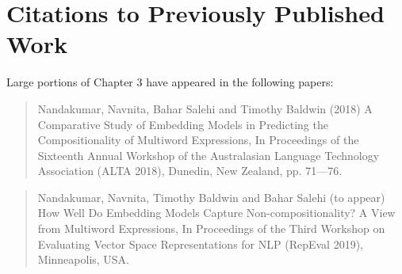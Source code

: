 \documentclass[12pt,a4paper, margin=1in]{report}
\begin{document}
\chapter*{\centering \LARGE Citations to Previously Published Work}
Large portions of Chapter 3 have appeared in the following papers:
\begin{quote}
Nandakumar, Navnita, Bahar Salehi and Timothy Baldwin (2018) A Comparative Study of Embedding Models in Predicting the Compositionality of Multiword Expressions, In Proceedings of the Sixteenth Annual Workshop of the Australasian Language Technology Association (ALTA 2018), Dunedin, New Zealand, pp. 71—76.
\end{quote}
\begin{quote}
Nandakumar, Navnita, Timothy Baldwin and Bahar Salehi (to appear) How Well Do Embedding Models Capture Non-compositionality? A View from Multiword Expressions, In Proceedings of the Third Workshop on Evaluating Vector Space Representations for NLP (RepEval 2019), Minneapolis, USA.
\end{quote}
 
\tableofcontents
\listoftables
\listoffigures
\newpage
{}








\nocite{*}
\end{document}
